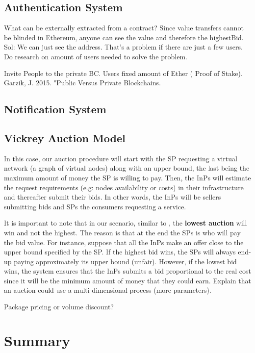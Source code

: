 \subsection{Authentication System}

What can be externally extracted from a contract? Since value transfers cannot be blinded in Ethereum, anyone can see the value and therefore the highestBid. Sol: We can just see the address. That's a problem if there are just a few users. Do research on amount of users needed to solve the problem.

Invite People to the private BC. Users fixed amount of Ether ( Proof of Stake). Garzik, J. 2015. "Public Versus Private Blockchains.

\subsection{Notification System}


\subsection{Vickrey Auction Model}

In this case, our auction procedure will start with the SP requesting a virtual network (a graph of virtual nodes) along with an upper bound, the last being the maximum amount of money the SP is willing to pay. Then, the InPs will estimate the request requirements (e.g: nodes availability or costs) in their infrastructure and thereafter submit their bids. In other words, the InPs will be sellers submitting bids and SPs the consumers requesting a service.

It is important to note that in our scenario, similar to \citep{zaheer2010multi}, the \textbf{lowest auction} will win and not the highest. The reason is that at the end the SPs is who will pay the bid value. For instance, suppose that all the InPs make an offer close to the upper bound specified by the SP. If the highest bid wins, the SPs will always end-up paying approximately its upper bound (unfair). However, if the lowest bid wins, the system ensures that the InPs submits a bid proportional to the real cost since it will be the minimum amount of money that they could earn.
Explain that an auction could use a multi-dimensional process (more parameters).

Package pricing or volume discount?

\section{Summary}

